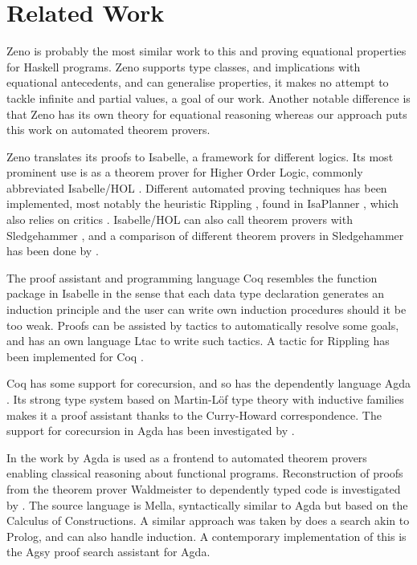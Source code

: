 \section{Related Work}

Zeno \citep{zeno} is probably the most similar work to this and
proving equational properties for Haskell programs. Zeno supports type
classes, and implications with equational antecedents, and can
generalise properties, it makes no attempt to tackle infinite and
partial values, a goal of our work. Another notable difference is that
Zeno has its own theory for equational reasoning whereas our approach
puts this work on automated theorem provers.


Zeno translates its proofs to Isabelle, a framework for different
logics. Its most prominent use is as a theorem prover for Higher Order
Logic, commonly abbreviated Isabelle/HOL \citep{isabelbook}. Different
automated proving techniques has been implemented, most notably the
heuristic Rippling \citep{dixonphd}, found in IsaPlanner
\citep{isaplanner}, which also relies on critics
\citep{productiveuse}. Isabelle/HOL can also call theorem provers with
Sledgehammer \citep{hammering}, and a comparison of different theorem
provers in Sledgehammer has been done by \cite{judgement}.

The proof assistant and programming language Coq resembles the
function package in Isabelle in the sense that each data type
declaration generates an induction principle and the user can write
own induction procedures should it be too weak. Proofs can be assisted
by tactics to automatically resolve some goals, and has an own
language Ltac to write such tactics. A tactic for Rippling has been
implemented for Coq \citep{inductioncoq}.

Coq has some support for corecursion, and so has the dependently
language Agda \citep{norell:thesis}. Its strong type system based on
Martin-Löf type theory \citep{mltt} with inductive families makes it a
proof assistant thanks to the Curry-Howard correspondence. The
support for corecursion in Agda has been investigated by \cite{productivity}.

In the work by \cite{agdaatp} Agda is used as a frontend to automated
theorem provers enabling classical reasoning about functional
programs. Reconstruction of proofs from the theorem prover Waldmeister
to dependently typed code is investigated by \cite{dtatp}. The source
language is Mella, syntactically similar to Agda but based on the
Calculus of Constructions. A similar approach was taken by \cite{agsy}
does a search akin to Prolog, and can also handle induction. A
contemporary implementation of this is the Agsy proof search assistant
for Agda.


